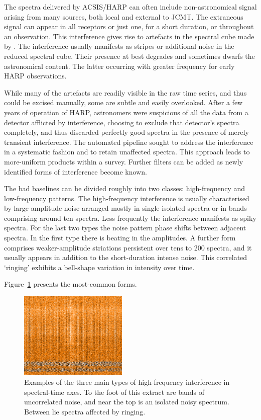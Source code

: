 \documentclass[final,authoryear,5p,times,twocolumn]{elsarticle}
\begin{document}
The spectra delivered by ACSIS/HARP can often include non-astronomical
signal arising from many sources, both local and external to JCMT. The
extraneous signal can appear in all receptors or just one, for a short
duration, or throughout an observation.  This interference gives rise
to artefacts in the spectral cube made by \makecube.  The interference
usually manifests as stripes or additional noise in the reduced
spectral cube.  Their presence at best degrades and sometimes dwarfs
the astronomical content.  The latter occurring with greater frequency
for early HARP observations.

While many of the artefacts are readily visible in the raw time
series, and thus could be excised manually, some are subtle and easily
overlooked.  After a few years of operation of HARP, astronomers were
suspicious of all the data from a detector afflicted by interference,
choosing to exclude that detector's spectra completely, and thus
discarded perfectly good spectra in the presence of merely transient
interference.  The automated pipeline sought to address the
interference in a systematic fashion and to retain unaffected spectra.
This approach leads to more-uniform products within a survey.  Further
filters can be added as newly identified forms of interference become
known.

The bad baselines can be divided roughly into two classes:
high-frequency and low-frequency patterns.  The high-frequency
interference is usually characterised by large-amplitude noise
arranged mostly in single isolated spectra or in bands comprising
around ten spectra.  Less frequently the interference manifests as
spiky spectra.  For the last two types the noise pattern phase shifts
between adjacent spectra.  In the first type there is beating in the
amplitudes.  A further form comprises weaker-amplitude striations
persistent over tens to 200 spectra, and it usually appears in
addition to the short-duration intense noise.  This correlated
`ringing' exhibits a bell-shape variation in intensity over time.

Figure~\ref{fig:badbase:highfreq} presents the most-common forms.

\begin{figure}[!ht]
\includegraphics[width=0.46\textwidth]{high_freq_three_types.png}
\caption{Examples of the three main types of high-frequency
  interference in spectral-time axes.  To the foot of this extract
  are bands of uncorrelated noise, and near the top is an isolated
  noisy spectrum.  Between lie spectra affected by ringing.}
\label{fig:badbase:highfreq}
\end{figure}
\end{document}
